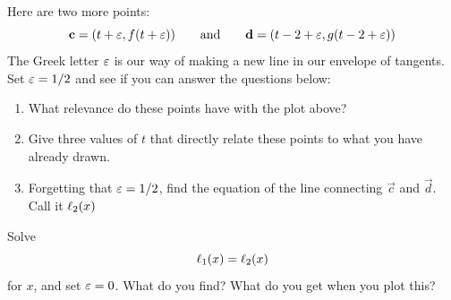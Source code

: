 \begin{prob}
Here are two more points:
\[
\mathbf{c} = (t+\varepsilon,f(t+\varepsilon)) \qquad \text{and}\qquad \mathbf{d}=(t-2+\varepsilon, g(t-2+\varepsilon))
\]
The Greek letter $\varepsilon$ is our way of making a new line in our
envelope of tangents. Set $\varepsilon = 1/2$ and see if you can answer the
questions below:
\begin{enumerate}
\item  What relevance do these points have with the plot above? 
\item Give three values of $t$ that directly relate these points to what you have
already drawn.
\item Forgetting that $\varepsilon = 1/2$, find the equation of the line connecting $\vec{c}$ and $\vec{d}$. Call it $\ell_2(x)$
\end{enumerate}
\end{prob}


\begin{prob}
Solve 
\[
\ell_1(x) = \ell_2(x)
\]
for $x$, and set $\varepsilon = 0$. What do you find? What do you get when you
plot this?
\end{prob}
